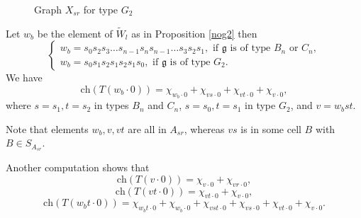 \documentclass{amsart}
\theoremstyle{definition}
\numberwithin{equation}{section}
\begin{document}
\begin{figure}[htbp]
  \centering
{}
  \caption{Graph $X_{sr}$ for type $G_2$}
  \label{fig:Xsr_G2}
\end{figure}

Let $w_b$ be the element of $\tilde W_l$ as in Proposition \ref{nog2} then
$$
\begin{cases}
    w_b = s_0s_2s_3\ldots s_{n-1}s_n s_{n-1}\ldots s_3s_2 s_1, \text{ if } \mathfrak{g} \text{ is of type } B_n \text{ or } C_n,\\
    w_b = s_0s_1s_2s_1s_2s_1s_0, \text{ if } \mathfrak{g} \text{ is of type } G_2.
\end{cases}
$$
We have
\begin{equation}\label{bad char}
    \mbox{ch}(T(w_b\cdot 0))=\chi_{w_b\cdot 0}+\chi_{vs\cdot 0}+\chi_{vt\cdot 0} + \chi_{v\cdot 0},
   \end{equation}
where $s = s_1, t=s_2$ in types $B_n$ and $C_n$,  $s=s_0, t =s_1$ in type  $G_2$, and $v=w_bst$.

Note that elements $w_b, v, vt$ are all in $A_{sr}$, whereas $vs$ is in some cell $B$ with $B\in S_{A_{sr}}$.

Another computation shows that 
$$
\mbox{ch}(T(v\cdot 0))=\chi_{v\cdot 0}+\chi_{vr\cdot 0},
$$
$$
\mbox{ch}(T(vt\cdot 0))=\chi_{vt\cdot 0}+\chi_{v\cdot 0},
$$
$$
\mbox{ch}(T(w_bt\cdot 0))= \chi_{w_bt\cdot 0}+\chi_{w_b\cdot 0} + \chi_{vst\cdot 0}+\chi_{vs\cdot 0}+\chi_{vt\cdot 0}+\chi_{v\cdot 0}.
$$
\end{document}
